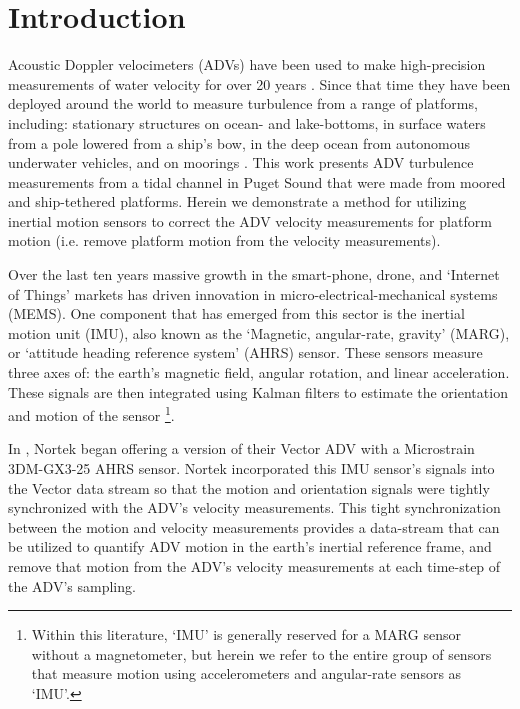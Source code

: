
\section{Introduction}

Acoustic Doppler velocimeters (ADVs) have been used to make high-precision measurements of water velocity for over 20 years \cite[]{Kraus++1994, Lohrmann++1995}.  Since that time they have been deployed around the world to measure turbulence from a range of platforms, including: stationary structures on ocean- and lake-bottoms, in surface waters from a pole lowered from a ship's bow, in the deep ocean from autonomous underwater vehicles, and on moorings \cite[e.g.][]{Voulgaris+Trowbridge1998, Zhang++2001, Kim++2000, Goodman++2006, Lorke2007, Geyer++2008, Cartwright++2009, Fer+Paskyabi2014}. This work presents ADV turbulence measurements from a tidal channel in Puget Sound that were made from moored and ship-tethered platforms.  Herein we demonstrate a method for utilizing inertial motion sensors to correct the ADV velocity measurements for platform motion (i.e. remove platform motion from the velocity measurements).



Over the last ten years massive growth in the smart-phone, drone, and `Internet of Things' markets has driven innovation in micro-electrical-mechanical systems (MEMS). One component that has emerged from this sector is the inertial motion unit (IMU), also known as the `Magnetic, angular-rate, gravity' (MARG), or `attitude heading reference system' (AHRS) sensor. These sensors measure three axes of: the earth's magnetic field, angular rotation, and linear acceleration. These signals are then integrated using Kalman filters to estimate the orientation and motion of the sensor \cite[]{Barshan+Whyte1995, Marins++2001, Bachmann++2003}\footnote{Within this literature, `IMU' is generally reserved for a MARG sensor without a magnetometer, but herein we refer to the entire group of sensors that measure motion using accelerometers and angular-rate sensors as `IMU'.}. 

In , Nortek began offering a version of their Vector ADV with a Microstrain 3DM-GX3-25 AHRS sensor. Nortek incorporated this IMU sensor's signals into the Vector data stream so that the motion and orientation signals were tightly synchronized with the ADV's velocity measurements. This tight synchronization between the motion and velocity measurements provides a data-stream that can be utilized to quantify ADV motion in the earth's inertial reference frame, and remove that motion from the ADV's velocity measurements at each time-step of the ADV's sampling.

